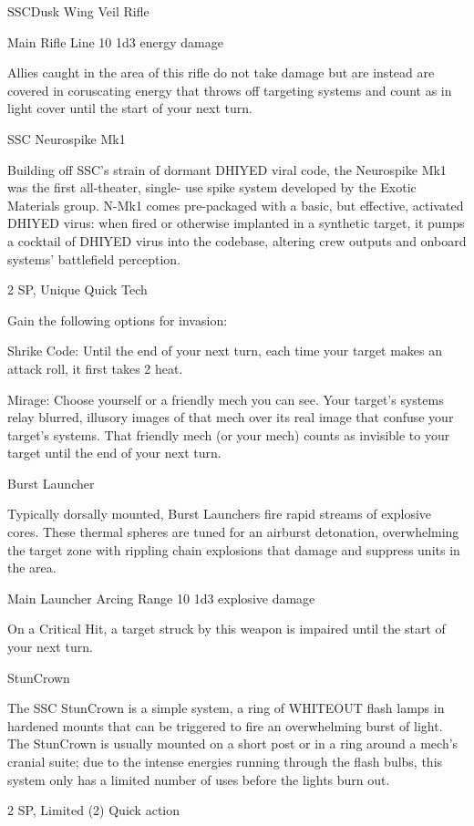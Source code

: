 \begin{mech}{SSC}{Dusk Wing}
Veil Rifle

Main Rifle
Line 10
1d3 energy damage

Allies caught in the area of this rifle do not take damage but are instead are covered in coruscating energy that throws off targeting systems and count as in light cover until the start of your next turn.


SSC Neurospike Mk1

Building off SSC's strain of dormant DHIYED viral code, the Neurospike Mk1 was the first all-theater, single- use spike system developed by the Exotic Materials group. N-Mk1 comes pre-packaged with a basic, but effective, activated DHIYED virus: when fired or otherwise implanted in a synthetic target, it pumps a cocktail of DHIYED virus into the codebase, altering crew outputs and onboard systems' battlefield perception.

2 SP, Unique
Quick Tech

Gain the following options for invasion:

Shrike Code: Until the end of your next turn, each time your target makes an attack roll, it first takes 2 heat.

Mirage: Choose yourself or a friendly mech you can see. Your target's systems relay blurred, illusory images of that mech over its real image that confuse your target's systems. That friendly mech (or your mech) counts as invisible to your target until the end of your next turn.


Burst Launcher

Typically dorsally mounted, Burst Launchers fire rapid streams of explosive cores. These thermal spheres are tuned for an airburst detonation, overwhelming the target zone with rippling chain explosions that damage and suppress units in the area.

Main Launcher
Arcing
Range 10
1d3 explosive damage

On a Critical Hit, a target struck by this weapon is impaired until the start of your next turn.


StunCrown


The SSC StunCrown is a simple system, a ring of WHITEOUT flash lamps in hardened mounts that can be triggered to fire an overwhelming burst of light. The StunCrown is usually mounted on a short post or in a ring around a mech's cranial suite; due to the intense energies running through the flash bulbs, this system only has a limited number of uses before the lights burn out.

2 SP, Limited (2)
Quick action


\end{mech}
